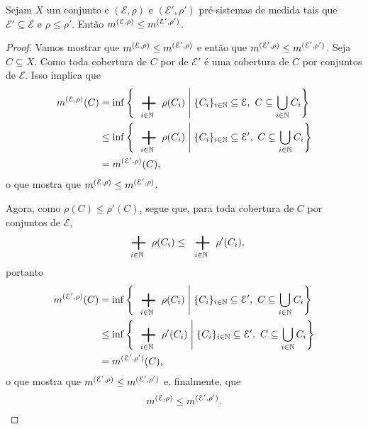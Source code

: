 \begin{proposition}
Sejam $X$ um conjunto e $(\mathcal E, \rho)$ e $(\mathcal E', \rho')$ pré-sistemas de medida tais que $\mathcal E' \subseteq \mathcal E$ e $\rho \leq \rho'$. Então $m^{(\mathcal E, \rho)} \leq m^{(\mathcal E', \rho')}$.
\end{proposition}
\begin{proof}
Vamos mostrar que $m^{(\mathcal E, \rho)} \leq m^{(\mathcal E', \rho)}$ e então que $m^{(\mathcal E', \rho)} \leq m^{(\mathcal E', \rho')}$. Seja $C \subseteq X$. Como toda cobertura de $C$ por de $\mathcal E'$ é uma cobertura de $C$ por conjuntos de $\mathcal E$. Isso implica que
	\begin{align*}
	\med^{(\mathcal E, \rho)}(C) &= \inf \set{\sum_{i \in \N} \rho(C_i)}{\{C_i\}_{i \in \N} \subseteq \mathcal E,\ C \subseteq \bigcup_{i \in \N} C_i} \\
	&\leq \inf \set{\sum_{i \in \N} \rho(C_i)}{\{C_i\}_{i \in \N} \subseteq \mathcal E',\ C \subseteq \bigcup_{i \in \N} C_i} \\
	&= \med^{(\mathcal E', \rho)}(C),
	\end{align*}
o que mostra que $m^{(\mathcal E, \rho)} \leq m^{(\mathcal E', \rho)}$.

Agora, como $\rho(C) \leq \rho'(C)$, segue que, para toda cobertura de $C$ por conjuntos de $\mathcal E$,
	\begin{equation*}
	\sum_{i \in \N} \rho(C_i) \leq \sum_{i \in \N} \rho'(C_i),
	\end{equation*}
portanto
	\begin{align*}
	\med^{(\mathcal E', \rho)}(C) &= \inf \set{\sum_{i \in \N} \rho(C_i)}{\{C_i\}_{i \in \N} \subseteq \mathcal E',\ C \subseteq \bigcup_{i \in \N} C_i} \\
	&\leq \inf \set{\sum_{i \in \N} \rho'(C_i)}{\{C_i\}_{i \in \N} \subseteq \mathcal E',\ C \subseteq \bigcup_{i \in \N} C_i} \\
	&= \med^{(\mathcal E', \rho')}(C),
	\end{align*}
o que mostra que $m^{(\mathcal E', \rho)} \leq m^{(\mathcal E', \rho')}$ e, finalmente, que
	\begin{equation*}
	m^{(\mathcal E, \rho)} \leq m^{(\mathcal E', \rho')}.
	\end{equation*}
\end{proof}







